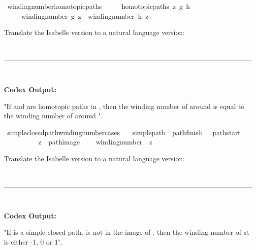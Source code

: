 \documentclass{article}
\begin{document}
\begin{boxB}
\begin{isabelle}
\isamarkupfalse \ winding{\isacharunderscore}{\kern0pt}number{\isacharunderscore}{\kern0pt}homotopic{\isacharunderscore}{\kern0pt}paths{\isacharcolon}{\kern0pt}\isanewline
\ \ \ \ \ {\isachardoublequoteopen}homotopic{\isacharunderscore}{\kern0pt}paths\ {\isacharparenleft}{\kern0pt}{\isacharminus}{\kern0pt}{\isacharbraceleft}{\kern0pt}z{\isacharbraceright}{\kern0pt}{\isacharparenright}{\kern0pt}\ g\ h{\isachardoublequoteclose}\isanewline
\ \ \ \ \ {\isachardoublequoteopen}winding{\isacharunderscore}{\kern0pt}number\ g\ z\ {\isacharequal}{\kern0pt}\ winding{\isacharunderscore}{\kern0pt}number\ h\ z{\isachardoublequoteclose}
\end{isabelle}
Translate the Isabelle version to a natural language version:

\
\hrule
\

\textbf{Codex Output:}

"If  and  are homotopic paths in , then the winding number of  around  is equal to the winding number of  around ".
\end{boxB}



\begin{boxB}
\begin{isabelle}
\isamarkupfalse \ simple{\isacharunderscore}{\kern0pt}closed{\isacharunderscore}{\kern0pt}path{\isacharunderscore}{\kern0pt}winding{\isacharunderscore}{\kern0pt}number{\isacharunderscore}{\kern0pt}cases{\isacharcolon}{\kern0pt}\isanewline
\ \ \isakeyword{assumes}\ {\isachardoublequoteopen}simple{\isacharunderscore}{\kern0pt}path\ {\isasymgamma}{\isachardoublequoteclose}\ {\isachardoublequoteopen}pathfinish\ {\isasymgamma}\ {\isacharequal}{\kern0pt}\ pathstart\ {\isasymgamma}{\isachardoublequoteclose}\ \isanewline
\ \ \ \ \ \ \ \ \ \ {\isachardoublequoteopen}z\ {\isasymnotin}\ path{\isacharunderscore}{\kern0pt}image\ {\isasymgamma}{\isachardoublequoteclose}\isanewline
\ \ \isakeyword{shows}\ {\isachardoublequoteopen}winding{\isacharunderscore}{\kern0pt}number\ {\isasymgamma}\ z\ {\isasymin}\ {\isacharbraceleft}{\kern0pt}{\isacharminus}{\kern0pt}{}{\isacharcomma}{\kern0pt}{}{\isacharcomma}{\kern0pt}{}{\isacharbraceright}{\kern0pt}{\isachardoublequoteclose}
\end{isabelle}
Translate the Isabelle version to a natural language version:

\
\hrule
\

\textbf{Codex Output:}

"If  is a simple closed path,  is not in the image of , then the winding number of  at  is either -1, 0 or 1".
\end{boxB}
\end{document}
